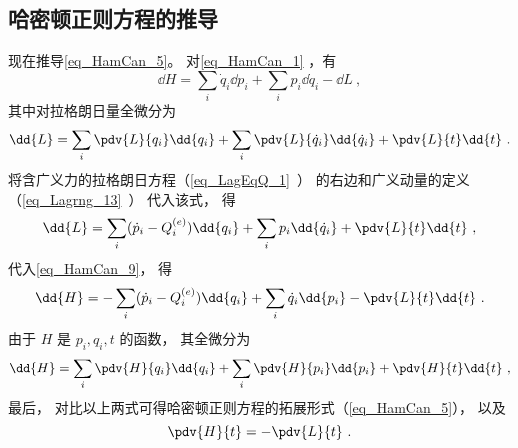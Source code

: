 \subsection{哈密顿正则方程的推导}
现在推导\autoref{eq_HamCan_5}。 对\autoref{eq_HamCan_1} ，有
\begin{equation}\label{eq_HamCan_9}
\dd{H} = \sum_i \dot q_i \dd{p_i} + \sum_i p_i \dd{\dot q_i} - \dd{L}~,
\end{equation}
其中对拉格朗日量全微分为
\begin{equation}
\dd{L} = \sum_i \pdv{L}{q_i}\dd{q_i} + \sum_i \pdv{L}{\dot q_i}\dd{\dot q_i} + \pdv{L}{t}\dd{t}~.
\end{equation}
将含广义力的拉格朗日方程（\autoref{eq_LagEqQ_1}~） 的右边和广义动量的定义（\autoref{eq_Lagrng_13}~） 代入该式， 得
\begin{equation}
\dd{L} = \sum_i (\dot p_i - Q_i^{(e)})\dd{q_i} + \sum_i p_i\dd{\dot q_i} + \pdv{L}{t}\dd{t}~,
\end{equation}
代入\autoref{eq_HamCan_9}， 得
\begin{equation}
\dd{H} = - \sum_i (\dot p_i - Q_i^{(e)}) \dd{q_i} + \sum_i \dot q_i \dd{p_i}  - \pdv{L}{t}\dd{t}~.
\end{equation}
由于 $H$ 是 $p_i, q_i, t$ 的函数， 其全微分为 
\begin{equation}
\dd{H} = \sum_i \pdv{H}{q_i}\dd{q_i} + \sum_i \pdv{H}{p_i}\dd{p_i} + \pdv{H}{t}\dd{t}~,
\end{equation}
最后， 对比以上两式可得哈密顿正则方程的拓展形式（\autoref{eq_HamCan_5}）， 以及
\begin{equation}
\pdv{H}{t} = - \pdv{L}{t}~.
\end{equation}
